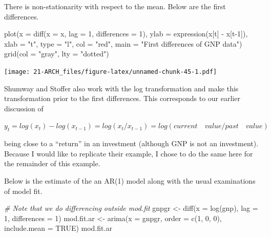 \documentclass[
]{book}
\newenvironment{Shaded}{\begin{snugshade}}{\end{snugshade}}
\newcommand{\AttributeTok}[1]{\textcolor[rgb]{0.77,0.63,0.00}{#1}}
\newcommand{\CommentTok}[1]{\textcolor[rgb]{0.56,0.35,0.01}{\textit{#1}}}
\newcommand{\ConstantTok}[1]{\textcolor[rgb]{0.00,0.00,0.00}{#1}}
\newcommand{\DecValTok}[1]{\textcolor[rgb]{0.00,0.00,0.81}{#1}}
\newcommand{\FunctionTok}[1]{\textcolor[rgb]{0.00,0.00,0.00}{#1}}
\newcommand{\NormalTok}[1]{#1}
\newcommand{\OtherTok}[1]{\textcolor[rgb]{0.56,0.35,0.01}{#1}}
\newcommand{\SpecialCharTok}[1]{\textcolor[rgb]{0.00,0.00,0.00}{#1}}
\newcommand{\StringTok}[1]{\textcolor[rgb]{0.31,0.60,0.02}{#1}}
\theoremstyle{definition}
\theoremstyle{definition}
\theoremstyle{definition}
\theoremstyle{definition}
\theoremstyle{remark}
\begin{document}
There is non-stationarity with respect to the mean. Below are the first differences.

\begin{Shaded}
\begin{Highlighting}[]
\FunctionTok{plot}\NormalTok{(}\AttributeTok{x =} \FunctionTok{diff}\NormalTok{(}\AttributeTok{x =}\NormalTok{ x, }\AttributeTok{lag =} \DecValTok{1}\NormalTok{, }\AttributeTok{differences =} \DecValTok{1}\NormalTok{), }\AttributeTok{ylab =} 
    \FunctionTok{expression}\NormalTok{(x[t] }\SpecialCharTok{{-}}\NormalTok{ x[t}\DecValTok{{-}1}\NormalTok{]), }\AttributeTok{xlab =} \StringTok{"t"}\NormalTok{, }\AttributeTok{type =} \StringTok{"l"}\NormalTok{, col }
    \OtherTok{=} \StringTok{"red"}\NormalTok{, }\AttributeTok{main =} \StringTok{"First differences of GNP data"}\NormalTok{)}
\FunctionTok{grid}\NormalTok{(}\AttributeTok{col =} \StringTok{"gray"}\NormalTok{, }\AttributeTok{lty =} \StringTok{"dotted"}\NormalTok{)}
\end{Highlighting}
\end{Shaded}

\texttt{[image: 21-ARCH\_files/figure-latex/unnamed-chunk-45-1.pdf]}

Shumway and Stoffer also work with the log transformation and make this transformation prior to the first differences. This corresponds to our earlier discussion of

\(y_t=log(x_t)-log(x_{t-1})=log(x_t/x_{t-1})=log(current \quad value/ past \quad value)\)

being close to a ``return'' in an investment (although GNP is not an investment). Because I would like to replicate their example, I chose to do the same here for the remainder of this example.

Below is the estimate of the an AR(1) model along with the usual examinations of model fit.

\begin{Shaded}
\begin{Highlighting}[]
\CommentTok{\# Note that we do differencing outside mod.fit}
\NormalTok{gnpgr }\OtherTok{\textless{}{-}} \FunctionTok{diff}\NormalTok{(}\AttributeTok{x =} \FunctionTok{log}\NormalTok{(gnp), }\AttributeTok{lag =} \DecValTok{1}\NormalTok{, }\AttributeTok{differences =} \DecValTok{1}\NormalTok{) }
\NormalTok{mod.fit.ar }\OtherTok{\textless{}{-}} \FunctionTok{arima}\NormalTok{(}\AttributeTok{x =}\NormalTok{ gnpgr, }\AttributeTok{order =} \FunctionTok{c}\NormalTok{(}\DecValTok{1}\NormalTok{, }\DecValTok{0}\NormalTok{, }\DecValTok{0}\NormalTok{), }
    \AttributeTok{include.mean =} \ConstantTok{TRUE}\NormalTok{)  }
\NormalTok{mod.fit.ar}
\end{Highlighting}
\end{Shaded}
\end{document}
